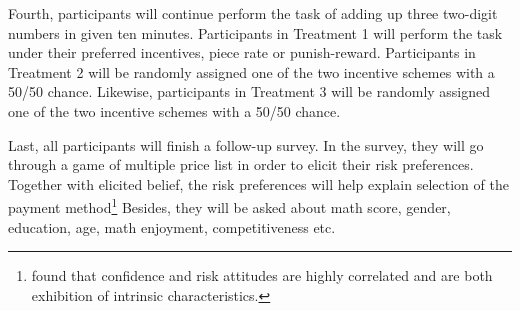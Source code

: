 \documentclass[12pt]{article}
\begin{document}
Fourth, participants will continue perform the task of adding up three two-digit numbers in given ten minutes. Participants in Treatment 1 will perform the task under their preferred incentives, piece rate or punish-reward. Participants in Treatment 2 will be randomly assigned one of the two incentive schemes with a 50/50 chance. Likewise, participants in Treatment 3 will be randomly assigned one of the two incentive schemes with a 50/50 chance.

Last, all participants will finish a follow-up survey. In the survey, they will go through a game of multiple price list in order to elicit their risk preferences. Together with elicited belief, the risk preferences will help explain selection of the payment method\footnote{\citet{Murad2016} found that confidence and risk attitudes are highly correlated and are both exhibition of intrinsic characteristics.} Besides, they will be asked about math score, gender, education, age, math enjoyment, competitiveness etc.

\end{document}
